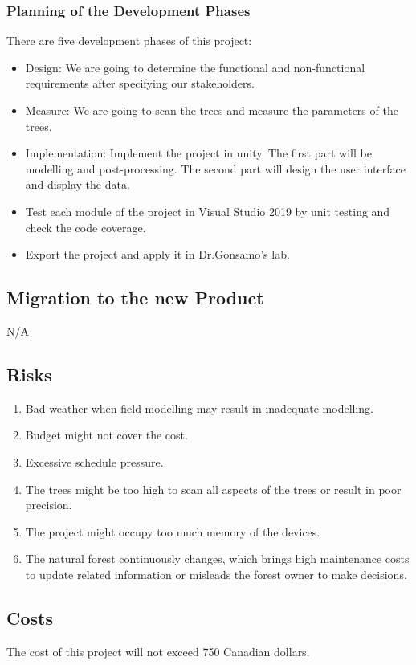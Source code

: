 \documentclass{article}
\begin{document}
\subsubsection{Planning of the Development Phases}
There are five development phases of this project:
\begin{itemize}
    \item Design: We are going to determine the functional and non-functional requirements after specifying our stakeholders.
    \item Measure: We are going to scan the trees and measure the parameters of the trees.
    \item Implementation: Implement the project in unity. The first part will be modelling and post-processing. The second part will design the user interface and display the data.
    \item Test each module of the project in Visual Studio 2019 by unit testing and check the code coverage.
    \item Export the project and apply it in Dr.Gonsamo's lab.
\end{itemize}
\subsection{Migration to the new Product}
N/A
\subsection{Risks}
\begin{enumerate}
    \item Bad weather when field modelling may result in inadequate modelling.
    \item Budget might not cover the cost.
    \item Excessive schedule pressure.
    \item The trees might be too high to scan all aspects of the trees or result in poor precision.
    \item The project might occupy too much memory of the devices.
    \item The natural forest continuously changes, which brings high maintenance costs to update related information or misleads the forest owner to make decisions. 
\end{enumerate}
\subsection{Costs}
The cost of this project will not exceed 750 Canadian dollars.
\end{document}

